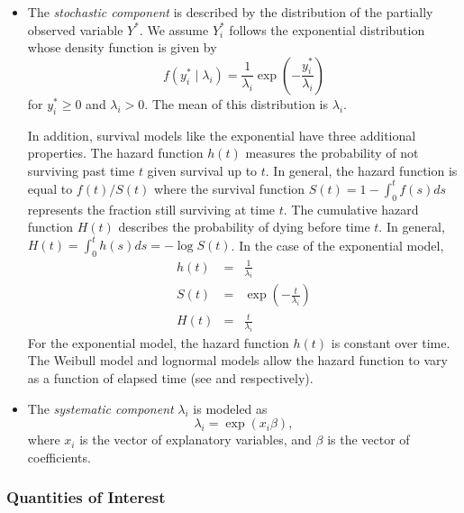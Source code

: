 \begin{itemize}
\item The \emph{stochastic component} is described by the distribution
  of the partially observed variable $Y^*$.  We assume $Y_i^*$ follows
  the exponential distribution whose density function is given by
  \begin{equation*}
    f(y_i^*\mid \lambda_i) = \frac{1}{\lambda_i} \exp\left(-\frac{y_i^*}{\lambda_i}\right)
  \end{equation*}
  for $y_i^*\ge 0$ and $\lambda_i>0$. The mean of this distribution is
  $\lambda_i$.  

  In addition, survival models like the exponential have three
  additional properties.  The hazard function $h(t)$ measures the
  probability of not surviving past time $t$ given survival up to
  $t$. In general, the hazard function is equal to $f(t)/S(t)$ where
  the survival function $S(t) = 1 - \int_{0}^t f(s) ds$ represents the
  fraction still surviving at time $t$.  The cumulative hazard
  function $H(t)$ describes the probability of dying before time $t$.
  In general, $H(t)= \int_{0}^{t} h(s) ds = -\log S(t)$.  In the case
  of the exponential model,
\begin{eqnarray*}
h(t) &=& \frac{1}{\lambda_i} \\
S(t) &=& \exp\left( -\frac{t}{\lambda_i} \right) \\
H(t) &=& \frac{t}{\lambda_i}
\end{eqnarray*}
For the exponential model, the hazard function $h(t)$ is constant over
time.  The Weibull model and lognormal models allow the hazard
function to vary as a function of elapsed time (see  and
 respectively).
  
\item The \emph{systematic component} $\lambda_i$ is modeled as
  \begin{equation*}
    \lambda_i = \exp(x_i \beta),
  \end{equation*}
  where $x_i$ is the vector of explanatory variables, and $\beta$ is
  the vector of coefficients.
\end{itemize}  


\subsubsection{Quantities of Interest} 

